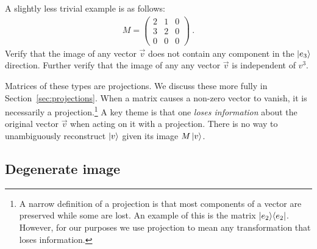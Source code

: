 \documentclass[12pt, oneside]{report}    %
\begin{document}
\begin{exercise}
A slightly less trivial example is as follows:
\begin{align}
    M = 
    \begin{pmatrix}
        2 & 1 & 0 \\
        3 & 2 & 0 \\
        0 & 0 & 0
    \end{pmatrix} \ .
\end{align}
Verify that the image of any vector $\vec{v}$ does not contain any component in the $\left|e_3\right\rangle$ direction. Further verify that the image of any any vector $\vec{v}$ is independent of $v^3$.
\end{exercise}

Matrices of these types are projections. We discuss these more fully in Section~\ref{sec:projections}. When a matrix causes a non-zero vector to vanish, it is necessarily a projection.\footnote{A narrow definition of a projection is that most components of a vector are preserved while some are lost. An example of this is the matrix $\left|e_2\right\rangle\!\left\langle e_2\right|$. However, for our purposes we use projection to mean any transformation that loses information.} A key theme is that one \emph{loses information} about the original vector $\vec{v}$ when acting on it with a projection. There is no way to unambiguously reconstruct $\left|v\right\rangle$ given its image $M\left|v\right\rangle$.



\subsection{Degenerate image}
\end{document}
